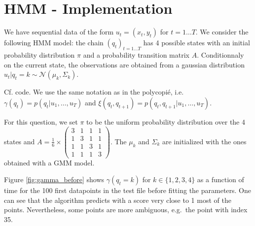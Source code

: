 \documentclass{article}
\begin{document}
\maketitle

\section*{HMM - Implementation}

We have sequential data of the form $u_t = (x_t, y_t)$ for $t=1\ldots T$. We consider the following HMM model: the chain $(q_t)_{t=1\ldots T}$ has 4 possible states with an initial probability distribution $\pi$ and a probability transition matrix $A$. Conditionnaly on the current state, the observations are obtained from a gaussian distribution $u_t|q_t=k \sim \mathcal{N}(\mu_k, \Sigma_k)$.


Cf. code. We use the same notation as in the polycopié, i.e. $\gamma(q_t) = p(q_t|u_1,\ldots,u_T)$ and $\xi(q_t, q_{t+1}) = p(q_t, q_{t+1}|u_1,\ldots,u_T)$.


For this question, we set $\pi$ to be the uniform probability distribution over the 4 states and $A = \frac{1}{6} \times 
\begin{pmatrix}
3 & 1 & 1 & 1\\
1 & 3 & 1 & 1\\
1 & 1 & 3 & 1\\
1 & 1 & 1 & 3
\end{pmatrix}$. The $\mu_k$ and $\Sigma_k$ are initialized with the ones obtained with a GMM model.

Figure \ref{fig:gamma_before} shows $\gamma(q_t = k)$ for $k\in\{1,2,3,4\}$ as a function of time for the 100 first datapoints in the test file before fitting the parameters. One can see that the algorithm predicts with a score very close to 1 most of the points. Nevertheless, some points are more ambiguous, e.g.~the point with index 35.

\end{document}
